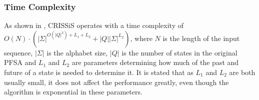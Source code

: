 {\subsubsection{Time Complexity\label{crissiscomplex}}

As shown in \citep{asok.11}, CRISSiS operates with a time complexity of $O(N)\cdot(|\Sigma|^{O(|Q|^3)+L_1+L_2}+|Q||\Sigma|^{L_2})$, where $N$ is the length of the input sequence, $|\Sigma|$ is the alphabet size, $|Q|$ is the number of states in the original PFSA and $L_1$ and $L_2$ are parameters determining how much of the past and future of a state is needed to determine it. It is stated that as $L_1$ and $L_2$ are both usually small, it does not affect the performance greatly, even though the algorithm is exponential in these parameters.																					

%
%
%
}
